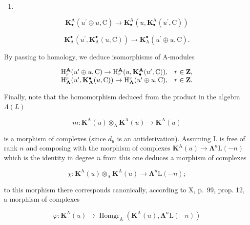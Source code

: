 \begin{enumerate}
\def\labelenumi{(\arabic{enumi})}
\setcounter{enumi}{5}
\tightlist
\item
\end{enumerate}

\[
\mathbf {K} _ {\bullet} ^ {\mathrm{A}} (u ^ {\prime} \oplus u, \mathrm{C}) \rightarrow \mathbf {K} _ {\bullet} ^ {\mathrm{A}} (u, \mathbf {K} _ {\bullet} ^ {\mathrm{A}} (u ^ {\prime}, \mathrm{C}))\tag{7}
\]

\[
\mathbf {K} _ {\mathrm{A}} ^ {\bullet} (u ^ {\prime}, \mathbf {K} _ {\mathrm{A}} ^ {\bullet} (u, \mathrm{C})) \rightarrow \mathbf {K} _ {\mathrm{A}} ^ {\bullet} (u ^ {\prime} \oplus u, \mathrm{C}).
\]

By passing to homology, we deduce isomorphisms of A-modules

\[
\begin{array}{c c} \mathrm{H} _ {r} ^ {\mathbf {A}} (u ^ {\prime} \oplus u, \mathrm{C}) \to \mathrm{H} _ {r} ^ {\mathbf {A}} (u, \mathbf {K} _ {\bullet} ^ {\mathbf {A}} (u ^ {\prime}, \mathrm{C}))  , & r \in \mathbf {Z}  , \\ \mathrm{H} _ {\mathbf {A}} ^ {r} (u ^ {\prime}, \mathbf {K} _ {\mathbf {A}} ^ {\bullet} (u, \mathrm{C})) \to \mathrm{H} _ {\mathbf {A}} ^ {r} (u ^ {\prime} \oplus u, \mathrm{C})  , & r \in \mathbf {Z}  . \end{array}
\]

Finally, note that the homomorphism deduced from the product in the algebra \(\Lambda(L)\)

\[
m: \mathbf {K} ^ {\mathrm{A}} (u) \otimes_ {\mathrm{A}} \mathbf {K} ^ {\mathrm{A}} (u) \rightarrow \mathbf {K} ^ {\mathrm{A}} (u)
\]

is a morphism of complexes (since \(d_{u}\) is an antiderivation). Assuming L is free of rank \(n\) and composing with the morphism of complexes \(\mathbf{K}^{\mathrm{A}}(u)\to\symbf{\Lambda}^{n}\mathrm{L}(-n)\) which is the identity in degree \(n\) from this one deduces a morphism of complexes

\[
\chi : \mathbf {K} ^ {\mathrm{A}} (u) \otimes_ {\mathrm{A}} \mathbf {K} ^ {\mathrm{A}} (u) \rightarrow \boldsymbol {\Lambda} ^ {n} \mathrm{L} (- n);
\]

to this morphism there corresponds canonically, according to X, p.~99, prop. 12, a morphism of complexes

\[
\varphi : \mathbf {K} ^ {\mathrm{A}} (u) \rightarrow \operatorname{Homgr} _ {\mathrm{A}} \left(\mathbf {K} ^ {\mathrm{A}} (u), \boldsymbol {\Lambda} ^ {n} \mathrm{L} (- n)\right)
\]

